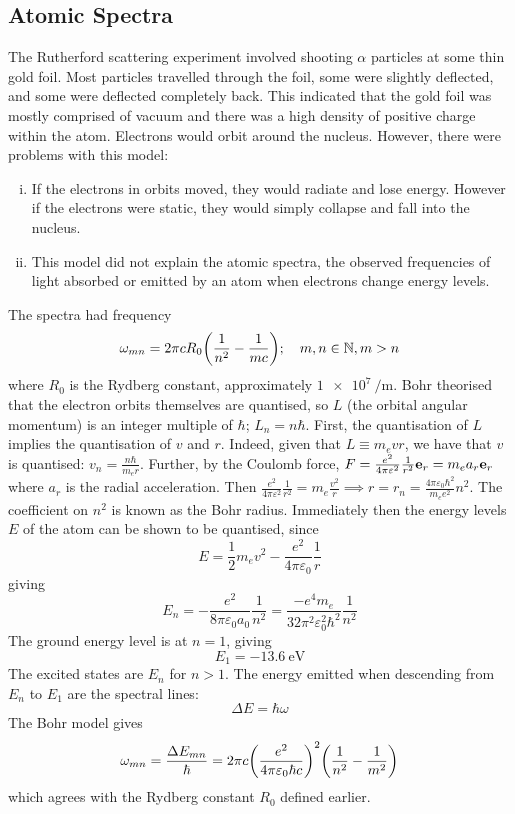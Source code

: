 \subsection{Atomic Spectra}
The Rutherford scattering experiment involved shooting \( \alpha \) particles at some thin gold foil.
Most particles travelled through the foil, some were slightly deflected, and some were deflected completely back.
This indicated that the gold foil was mostly comprised of vacuum and there was a high density of positive charge within the atom.
Electrons would orbit around the nucleus.
However, there were problems with this model:
\begin{enumerate}[(i)]
	\item If the electrons in orbits moved, they would radiate and lose energy.
	      However if the electrons were static, they would simply collapse and fall into the nucleus.
	\item This model did not explain the atomic spectra, the observed frequencies of light absorbed or emitted by an atom when electrons change energy levels.
\end{enumerate}
The spectra had frequency
\[
	\omega_{mn} = 2 \pi c R_0 \qty(\frac{1}{n^2} - \frac{1}{mc}); \quad m, n \in \mathbb N, m > n
\]
where \( R_0 \) is the Rydberg constant, approximately \( \SI{1e7}{\per\metre} \).
Bohr theorised that the electron orbits themselves are quantised, so \( L \) (the orbital angular momentum) is an integer multiple of \( \hbar \); \( L_n = n \hbar \).
First, the quantisation of \( L \) implies the quantisation of \( v \) and \( r \).
Indeed, given that \( L \equiv m_e v r \), we have that \( v \) is quantised: \( v_n = \frac{n\hbar}{m_e r} \).
Further, by the Coulomb force, \( F = \frac{e^2}{4 \pi \varepsilon^2} \frac{1}{r^2} \vb e_r = m_e a_r \vb e_r \) where \( a_r \) is the radial acceleration.
Then \( \frac{e^2}{4 \pi \varepsilon^2} \frac{1}{r^2} = m_e \frac{v^2}{r} \implies r = r_n = \frac{4 \pi \varepsilon_0 \hbar^2}{m_e e^2} n^2 \).
The coefficient on \( n^2 \) is known as the Bohr radius.
Immediately then the energy levels \( E \) of the atom can be shown to be quantised, since
\[
	E = \frac{1}{2} m_e v^2 - \frac{e^2}{4 \pi \varepsilon_0} \frac{1}{r}
\]
giving
\[
	E_n = -\frac{e^2}{8 \pi \varepsilon_0 a_0} \frac{1}{n^2} = \frac{-e^4 m_e}{32 \pi^2 \varepsilon_0^2 \hbar^2} \frac{1}{n^2}
\]
The ground energy level is at \( n = 1 \), giving
\[
	E_1 = -\SI{13.6}{\eV}
\]
The excited states are \( E_n \) for \( n > 1 \).
The energy emitted when descending from \( E_n \) to \( E_1 \) are the spectral lines:
\[
	\Delta E = \hbar \omega
\]
The Bohr model gives
\[
	\omega_{mn} = \frac{\Delta E_{mn}}{\hbar} = 2 \pi c \qty( \frac{e^2}{4 \pi \varepsilon_0 \hbar c} )^2 \qty( \frac{1}{n^2} - \frac{1}{m^2} )
\]
which agrees with the Rydberg constant \( R_0 \) defined earlier.
